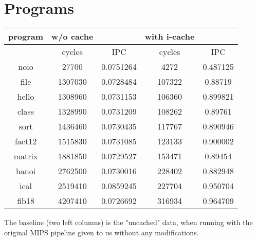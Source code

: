 \documentclass[a4paper,11pt]{article}
\begin{document}
\section{Programs}
\begin{tabular}{| c | c | c | c | c |}
  \hline
  program & w/o cache & & with i-cache &\\
  \hline
  & cycles & IPC & cycles & IPC \\
  \hline
  noio & 27700 & 0.0751264 & 4272 & 0.487125\\
  file & 1307030 & 0.0728484 & 107322 & 0.88719\\
  hello & 1308960 & 0.0731153 & 106360 & 0.899821\\
  class & 1328990 & 0.0731209 & 108262 & 0.89761 \\
  sort & 1436460 & 0.0730435 & 117767 & 0.890946 \\
  fact12 & 1515830 & 0.0731085 & 123133 & 0.900002\\
  matrix & 1881850 & 0.0729527 & 153471 & 0.89454 \\
  hanoi & 2762500 & 0.0730016 & 228402 & 0.882948 \\
  ical & 2519410 & 0.0859245 & 227704 & 0.950704 \\
  fib18 & 4207410 & 0.0726692 & 316934 & 0.964709 \\
  \hline
\end{tabular}

The baseline (two left columns) is the "uncached" data, when running with the original MIPS pipeline given to us without any modifications.
\end{document}
